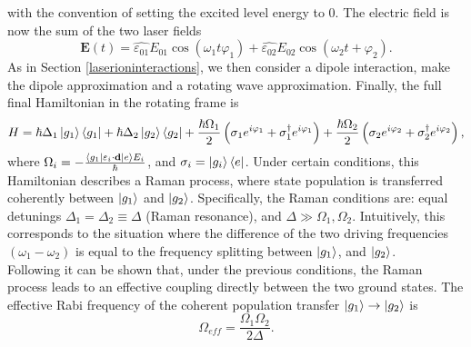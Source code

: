 with the convention of setting the excited level energy to 0. The electric field is now the sum of the two laser fields
\begin{equation}
\mathbf{E}(t) = \hat{\varepsilon_{01}} E_{01} \cos(\omega_{1} t \varphi_1) + \hat{\varepsilon_{02}} E_{02} \cos(\omega_2 t + \varphi_2).
\end{equation}
As in Section \ref{laserioninteractions}, we then consider a dipole interaction, make the dipole approximation and a rotating wave approximation. Finally, the full final Hamiltonian in the rotating frame is
\begin{equation}
H = \hbar \Delta_1 \ket{g_1}\bra{g_1} + \hbar\Delta_2 \ket{g_2}\bra{g_2}+ \frac{\hbar \Omega_1}{2}\left(\sigma_1 e^{i\varphi_1} +\sigma_1^\dagger e^{i\varphi_1}\right)+ \frac{\hbar \Omega_2}{2}\left(\sigma_2 e^{i\varphi_2} +\sigma_2^\dagger e^{i\varphi_2}\right),
\end{equation}
where $\Omega_i = -\frac{\braket{g_1|\varepsilon_i \cdot \mathbf{d}|e}E_{i}}{\hbar}$, and $\sigma_i = \ket{g_i}\bra{e}$. Under certain conditions, this Hamiltonian describes a Raman process, where state population is transferred coherently between $\ket{g_1}$ and $\ket{g_2}$. Specifically, the Raman conditions are: equal detunings $\Delta_1 = \Delta_2 \equiv \Delta$ (Raman resonance), and $\Delta \gg \Omega_1,\Omega_2$.
Intuitively, this corresponds to the situation where the difference of the two driving frequencies $(\omega_1-\omega_2)$ is equal to the frequency splitting between $\ket{g_1}$, and $\ket{g_2}$.\\
Following \cite{russo} it can be shown that, under the previous conditions, the Raman process leads to an effective coupling directly between the two ground states. The effective Rabi frequency of the coherent population transfer $\ket{g_1} \to \ket{g_2}$ is \cite{steck}
\begin{equation}
\label{eq:effectiverabi}
\Omega_{eff} = \frac{\Omega_1\Omega_2}{2\Delta}.
\end{equation}

